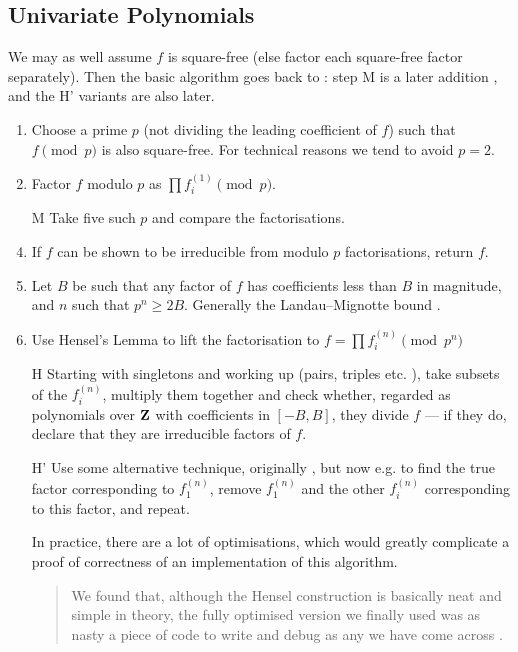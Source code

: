\documentclass{llncs}
\begin{document}
\subsection{Univariate Polynomials}
We may as well assume $f$ is square-free (else factor each square-free factor separately). Then the basic algorithm goes back to \cite{Zassenhaus1969}: step M is a later addition \cite{Musser1975a}, and the  H' variants are also later.
\begin{enumerate}
\item Choose a prime $p$ (not dividing the leading coefficient of $f$) such that $f\pmod p$ is also square-free. For technical reasons we tend to avoid $p=2$.
\item\label{step:p} Factor $f$ modulo $p$ as $\prod f_i^{(1)} \pmod p$.
\item[M]Take five such $p$ and compare the factorisations.
\item If $f$ can be shown to be irreducible from modulo $p$ factorisations, return $f$.
\item Let $B$ be such that any factor of $f$ has coefficients less than $B$ in magnitude, and $n$ such that $p^n\ge 2B$. Generally the Landau--Mignotte bound \cite{Landau1905,Mignotte1974}.
\item Use Hensel's Lemma to lift the factorisation to $f=\prod f_i^{(n)} \pmod {p^n}$
\item[H]\label{step:H} Starting with singletons and working up (pairs, triples etc. \cite{Collins1979}), take subsets of the $f_i^{(n)}$, multiply them together and check whether, regarded as polynomials over ${\bf Z}$ with coefficients in $[-B,B]$, they divide $f$ --- if they do, declare that they are irreducible factors of $f$.
\item[H']\label{step:H'}Use some alternative technique, originally \cite{Lenstraetal1982}, but now e.g. \cite{Abbottetal2000a} to find the true factor corresponding to $f_1^{(n)}$, remove $f_1^{(n)}$ and the other $f_i^{(n)}$ corresponding to this factor, and repeat.
\item[\dbend]In practice, there are a lot of optimisations, which would greatly complicate a proof of correctness of an implementation of this algorithm.
\begin{quote}
We found that, although the Hensel construction is basically neat and simple in theory,
the fully optimised version we finally used was as nasty a piece of code to write and
debug as any we have come across \cite{MooreNorman1981}.
\end{quote}
\end{enumerate}
\end{document}
